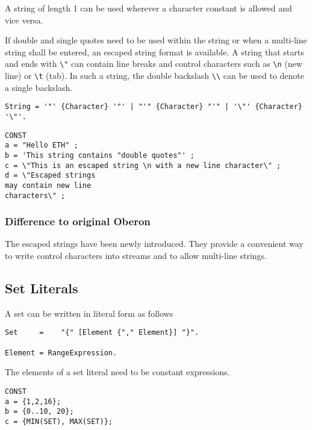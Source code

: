 \documentclass[a4wide,11pt]{article}
\begin{document}
A string of length 1 can be used wherever a character constant is allowed and vice versa.

If double and single quotes need to be used within the string or when a multi-line string shall be entered, an escaped string format is available.
A string that starts and ends with \verb~\"~ can contain line breaks and control characters such as \verb~\n~ (new line) or \verb~\t~ (tab).
In such a string, the double backslash \lstinline"\\" can be used to denote a single backslash.

\begin{lstlisting}[style=ebnf]
String = '"' {Character} '"' | "'" {Character} "'" | '\"' {Character} '\"'.
\end{lstlisting}

\begin{annotation}
\begin{lstlisting}[style=example, caption=Examples of string literals in constant declarations]
CONST
a = "Hello ETH" ;
b = 'This string contains "double quotes"' ;
c = \"This is an escaped string \n with a new line character\" ;
d = \"Escaped strings
may contain new line
characters\" ;
\end{lstlisting}

\subsubsection{Difference to original Oberon}
The escaped strings have been newly introduced.
They provide a convenient way to write control characters into streams and to allow multi-line strings.

\end{annotation}

\subsection{Set Literals}

A set can be written in literal form as follows
\begin{lstlisting}[style=ebnf]
Set	    =	 "{" [Element {"," Element}] "}".

Element = RangeExpression.
\end{lstlisting}
The elements of a set literal need to be constant expressions.


\begin{annotation}
\begin{lstlisting}[style=example, caption=Examples of set literals in constant declarations]
CONST
a = {1,2,16};
b = {0..10, 20};
c = {MIN(SET), MAX(SET)};
\end{lstlisting}
\end{annotation}
\end{document}
